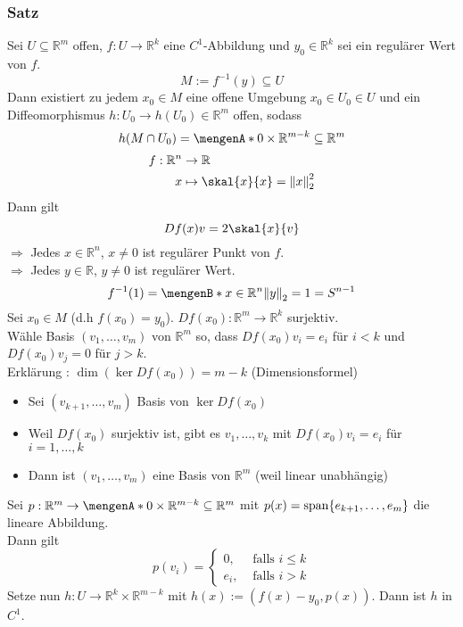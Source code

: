 \subsubsection{Satz} %
\label{satz210}
Sei $ U \subseteq \mathbb{R}^m$ offen, $ f: U \to \mathbb{R}^k $ eine $C^1$-Abbildung und $y_0 \in \mathbb{R}^k$ sei ein regulärer Wert von $f$.
\[
	M:=f^{-1}(y) \subseteq U
\]  
Dann existiert zu jedem $x_0 \in M$ eine offene Umgebung $x_0 \in U_0 \in U$ und ein Diffeomorphismus $h: U_0 \to h(U_0)\in \mathbb{R}^m$ offen, sodass 
\[
	h(M \cap U_0)= \set{0} \times \mathbb{R}^{m-k} \subseteq \mathbb{R}^m
\]
\begin{align*}
	f: \mathbb{R}^n &\to \mathbb{R} \\
	x &\mapsto \skal{x}{x} = \norm{x}_2^2 
\end{align*}
Dann gilt
\[
	Df(x)v = 2 \skal{x}{v}
\]
$\Rightarrow$ Jedes $x \in \mathbb{R}^n$, $x \neq 0$ ist regulärer Punkt von $f$. \\
$\Rightarrow $ Jedes $y \in \mathbb{R}$, $y \neq 0$ ist regulärer Wert.
\[
	f^{-1}(1)= \set[x \in \mathbb{R}^n]{\norm{y}_2=1} = S^{n-1}
\]
Sei $x_0 \in M$ (d.h $f(x_0)=y_0$). $Df(x_0): \mathbb{R}^m \to \mathbb{R}^k$ surjektiv. \\
Wähle Basis $(v_1, \dots, v_m)$ von $\mathbb{R}^m$ so, dass $Df(x_0)v_i=e_i$ für $i<k$ und $Df(x_0)v_j=0$ für $j>k$. \\
Erklärung : $\dim(\ker Df(x_0))=m-k$ (Dimensionsformel) \\
\begin{itemize}
	\item Sei $(v_{k+1}, \dots, v_m)$ Basis von $\ker Df(x_0)$
	\item Weil $Df(x_0)$ surjektiv ist, gibt es $v_1, \dots, v_k$ mit $Df(x_0)v_i=e_i$ für $i=1,\dots,k$
	\item Dann ist $(v_1, \dots, v_m)$ eine Basis von $\mathbb{R}^m$ (weil linear unabhängig)
\end{itemize}
Sei $p: \mathbb{R}^m \to \set{0} \times \mathbb{R}^{m-k} \subseteq \mathbb{R}^m$ mit $p(x)=\operatorname{span}\{ e_{k+1}, \dots, e_m \}$ die lineare Abbildung. \\
Dann gilt
\[
	p(v_i)= \begin{cases}
		0, &\text{ falls }i \leq k\\
		e_i, &\text{ falls }i >k
	\end{cases}
\]
Setze nun $h: U \to \mathbb{R}^k \times \mathbb{R}^{m-k}$ mit $h(x):=(f(x)-y_0,p(x))$. Dann ist $h$ in $C^1$. \\
